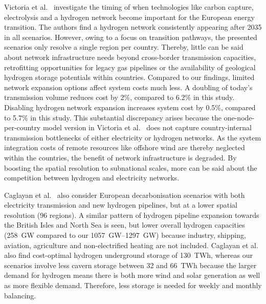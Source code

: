 Victoria et al.~\cite{victoriaSpeedTechnological2022} investigate the timing of
when technologies like carbon capture, electrolysis and a hydrogen network
become important for the European energy transition. The authors find a hydrogen
network consistently appearing after 2035 in all scenarios. However, owing to a
focus on transition pathways, the presented scenarios only resolve a single
region per country. Thereby, little can be said about network infrastructure
needs beyond cross-border transmission capacities, retrofitting opportunities
for legacy gas pipelines or the availability of geological hydrogen storage
potentials within countries. Compared to our findings, limited network expansion
options affect system costs much less. A doubling of today's transmission volume
reduces cost by 2\%, compared to 6.2\% in this study. Disabling hydrogen network
expansion increases system cost by 0.5\%, compared to 5.7\% in this study. This
substantial discrepancy arises because the one-node-per-country model version in
Victoria et al.~\cite{victoriaSpeedTechnological2022} does not capture
country-internal transmission bottlenecks of either electricity or hydrogen
networks. As the system integration costs of remote resources like offshore wind
are thereby neglected within the countries, the benefit of network
infrastructure is degraded. By boosting the spatial resolution to subnational
scales, more can be said about the competition between hydrogen and electricity
networks.

Caglayan et al.~\cite{Caglayan2019} also consider European decarbonisation
scenarios with both electricity transmission and new hydrogen pipelines, but at
a lower spatial resolution (96 regions). A similar pattern of hydrogen pipeline
expansion towards the British Isles and North Sea is seen, but lower overall
hydrogen capacities (258~GW compared to our \SIrange{1057}{1297}{\giga\watt})
because industry, shipping, aviation, agriculture and non-electrified heating
are not included. Caglayan et al.~\cite{Caglayan2019} also find cost-optimal
hydrogen underground storage of 130~TWh, whereas our scenarios involve less
cavern storage between 32 and 66~TWh because the larger demand for hydrogen
means there is both more wind and solar generation as well as more flexible demand.
Therefore, less storage is needed for weekly and monthly balancing.

